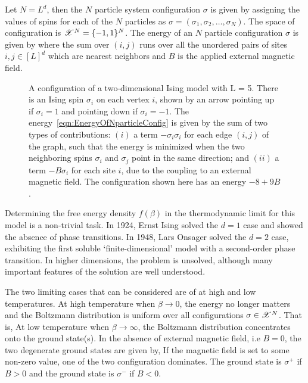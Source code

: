 \documentclass[letterpaper,english,10pt]{article}
\begin{document}
Let $N = L^d$, then the $N$ particle system configuration $\sigma$ is given by assigning the values of spins  for each of the $N$ particles as $\sigma = (\sigma_1, \sigma_2, \dots, \sigma_N)$. 
The space of configuration is $\mathscr{X}^N = \{-1,1\}^N$. 
The energy of an $N$ particle configuration $\sigma$ is given by
where the sum over $(i,j)$ runs over all the unordered pairs of sites $i,j \in [L]^d$ which are nearest neighbors and $B$ is the applied external magnetic field. 

\begin{figure}
\centering

\caption{A configuration of a two-dimensional Ising model with L = 5. There is an Ising spin $\sigma_i$ on each vertex $i$, shown by an arrow pointing up if $\sigma_i = 1$ and pointing down if $\sigma_i = -1$.
The energy~\eqref{eqn:EnergyOfNparticleConfig}  is given by the sum of two types of contributions: 
$(i)$ a term $-\sigma_i\sigma_i$ for each edge $(i, j)$ of the graph, such that the energy is minimized when the two neighboring spins $\sigma_i$ and $\sigma_j$ point in the same direction; 
and $(ii)$ a term $-B\sigma_i$ for each site $i$, due to the coupling to an external magnetic field. 
The configuration shown here has an energy $-8+9B$.}
\label{figure:IsingSpins}
\end{figure}

Determining the free energy density $f(\beta)$ in the thermodynamic limit for this model is a non-trivial task. In 1924, Ernst Ising solved the $d=1$ case and showed the absence of phase transitions. 
In 1948, Lars Onsager solved the $d=2$ case, exhibiting the first soluble `finite-dimensional' model with a second-order phase transition. 
In higher dimensions, the problem is unsolved, although many important features of the solution are well understood.

The two limiting cases that can be considered are of at high and low temperatures. 
At high temperature when $\beta \to 0$, the energy no longer matters and the Boltzmann distribution is uniform over all configurations $\sigma \in \mathscr{X}^N$. 
That is, 
At low temperature when $\beta \to \infty$, 
the Boltzmann distribution concentrates onto the ground state(s). 
In the absence of external magnetic field, i.e $B=0$, the two degenerate ground states are given by,
If the magnetic field is set to some non-zero value, one of the two configuration dominates. 
The ground state is $\sigma^+$ if $B>0$ and the ground state is $\sigma^-$ if $B<0$.
\end{document}
